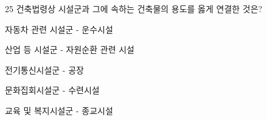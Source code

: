\begin{question}{25}
건축법령상 시설군과 그에 속하는 건축물의 용도를 옳게 연결한 것은?
\begin{choices}
  \item 자동차 관련 시설군 - 운수시설
  \item 산업 등 시설군 - 자원순환 관련 시설
  \item 전기통신시설군 - 공장
  \item 문화집회시설군 - 수련시설
  \item 교육 및 복지시설군 - 종교시설
\end{choices}
\end{question}
